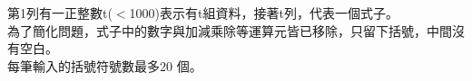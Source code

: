 第1列有一正整數t($<$1000)表示有t組資料，接著t列，代表一個式子。\\
為了簡化問題，式子中的數字與加減乘除等運算元皆已移除，只留下括號，中間沒有空白。\\
每筆輸入的括號符號數最多20 個。\\
